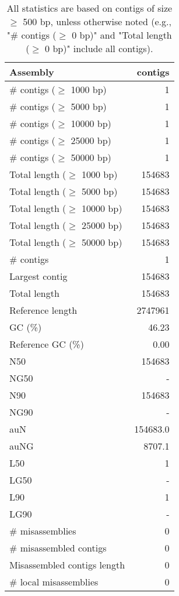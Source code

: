 \documentclass[12pt,a4paper]{article}
\begin{document}
\begin{table}[ht]
\begin{center}
\caption{All statistics are based on contigs of size $\geq$ 500 bp, unless otherwise noted (e.g., "\# contigs ($\geq$ 0 bp)" and "Total length ($\geq$ 0 bp)" include all contigs).}
\begin{tabular}{|l*{1}{|r}|}
\hline
Assembly & contigs \\ \hline
\# contigs ($\geq$ 1000 bp) & 1 \\ \hline
\# contigs ($\geq$ 5000 bp) & 1 \\ \hline
\# contigs ($\geq$ 10000 bp) & 1 \\ \hline
\# contigs ($\geq$ 25000 bp) & 1 \\ \hline
\# contigs ($\geq$ 50000 bp) & 1 \\ \hline
Total length ($\geq$ 1000 bp) & 154683 \\ \hline
Total length ($\geq$ 5000 bp) & 154683 \\ \hline
Total length ($\geq$ 10000 bp) & 154683 \\ \hline
Total length ($\geq$ 25000 bp) & 154683 \\ \hline
Total length ($\geq$ 50000 bp) & 154683 \\ \hline
\# contigs & 1 \\ \hline
Largest contig & 154683 \\ \hline
Total length & 154683 \\ \hline
Reference length & 2747961 \\ \hline
GC (\%) & 46.23 \\ \hline
Reference GC (\%) & 0.00 \\ \hline
N50 & 154683 \\ \hline
NG50 & - \\ \hline
N90 & 154683 \\ \hline
NG90 & - \\ \hline
auN & 154683.0 \\ \hline
auNG & 8707.1 \\ \hline
L50 & 1 \\ \hline
LG50 & - \\ \hline
L90 & 1 \\ \hline
LG90 & - \\ \hline
\# misassemblies & 0 \\ \hline
\# misassembled contigs & 0 \\ \hline
Misassembled contigs length & 0 \\ \hline
\# local misassemblies & 0 \\ \hline

\end{tabular}
\end{center}
\end{table}
\end{document}
